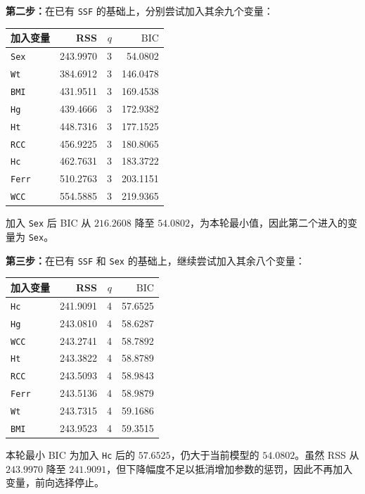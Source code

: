 \documentclass[12pt,a4paper]{article}
\begin{document}
\begin{answerbox}
\textbf{第二步：}在已有 \texttt{SSF} 的基础上，分别尝试加入其余九个变量：

\begin{center}
\small
\begin{tabular}{lrrr}
\toprule
加入变量 & RSS & $q$ & $\mathrm{BIC}$ \\
\midrule
\texttt{Sex} & 243.9970 & 3 & 54.0802 \\
\texttt{Wt} & 384.6912 & 3 & 146.0478 \\
\texttt{BMI} & 431.9511 & 3 & 169.4538 \\
\texttt{Hg} & 439.4666 & 3 & 172.9382 \\
\texttt{Ht} & 448.7316 & 3 & 177.1525 \\
\texttt{RCC} & 456.9225 & 3 & 180.8065 \\
\texttt{Hc} & 462.7631 & 3 & 183.3722 \\
\texttt{Ferr} & 510.2763 & 3 & 203.1151 \\
\texttt{WCC} & 554.5885 & 3 & 219.9365 \\
\bottomrule
\end{tabular}
\end{center}
加入 \texttt{Sex} 后 BIC 从 $216.2608$ 降至 $54.0802$，为本轮最小值，因此第二个进入的变量为 \texttt{Sex}。

\textbf{第三步：}在已有 \texttt{SSF} 和 \texttt{Sex} 的基础上，继续尝试加入其余八个变量：

\begin{center}
\small
\begin{tabular}{lrrr}
\toprule
加入变量 & RSS & $q$ & $\mathrm{BIC}$ \\
\midrule
\texttt{Hc} & 241.9091 & 4 & 57.6525 \\
\texttt{Hg} & 243.0810 & 4 & 58.6287 \\
\texttt{WCC} & 243.2741 & 4 & 58.7892 \\
\texttt{Ht} & 243.3822 & 4 & 58.8789 \\
\texttt{RCC} & 243.5093 & 4 & 58.9843 \\
\texttt{Ferr} & 243.5136 & 4 & 58.9879 \\
\texttt{Wt} & 243.7315 & 4 & 59.1686 \\
\texttt{BMI} & 243.9523 & 4 & 59.3515 \\
\bottomrule
\end{tabular}
\end{center}
本轮最小 BIC 为加入 \texttt{Hc} 后的 $57.6525$，仍大于当前模型的 $54.0802$。虽然 RSS 从 $243.9970$ 降至 $241.9091$，但下降幅度不足以抵消增加参数的惩罚，因此不再加入变量，前向选择停止。


\end{answerbox}
\end{document}

